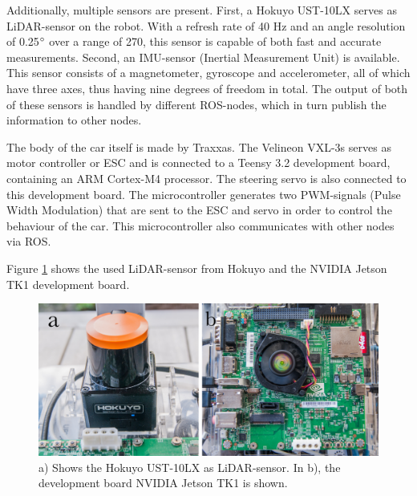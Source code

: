 \documentclass[conference,a4paper]{IEEEtran}
\begin{document}
Additionally, multiple sensors are present. First, a Hokuyo UST-10LX serves as LiDAR-sensor on the robot. With a refresh rate of 40 Hz and an angle resolution of 0.25$\degree$ over a range of 270\degree, this sensor is capable of both fast and accurate measurements. Second, an IMU-sensor (Inertial Measurement Unit) is available. This sensor consists of a magnetometer, gyroscope and accelerometer, all of which have three axes, thus having nine degrees of freedom in total. The output of both of these sensors is handled by different ROS-nodes, which in turn publish the information to other nodes.

The body of the car itself is made by Traxxas. The Velineon VXL-3s serves as motor controller or ESC and is connected to a Teensy 3.2 development board, containing an ARM Cortex-M4 processor. The steering servo is also connected to this development board. The microcontroller generates two PWM-signals (Pulse Width Modulation) that are sent to the ESC and servo in order to control the behaviour of the car. This microcontroller also communicates with other nodes via ROS.


Figure \ref{fig:f1_lidar_tk1} shows the used LiDAR-sensor from Hokuyo and the NVIDIA Jetson TK1 development board.

\begin{figure}[!t]
	\includegraphics[width=\columnwidth]{f1_lidar_tk1}
	\centering
	\caption{a) Shows the Hokuyo UST-10LX as LiDAR-sensor. In b), the development board NVIDIA Jetson TK1 is shown.}
	\label{fig:f1_lidar_tk1}
\end{figure}
\end{document}
